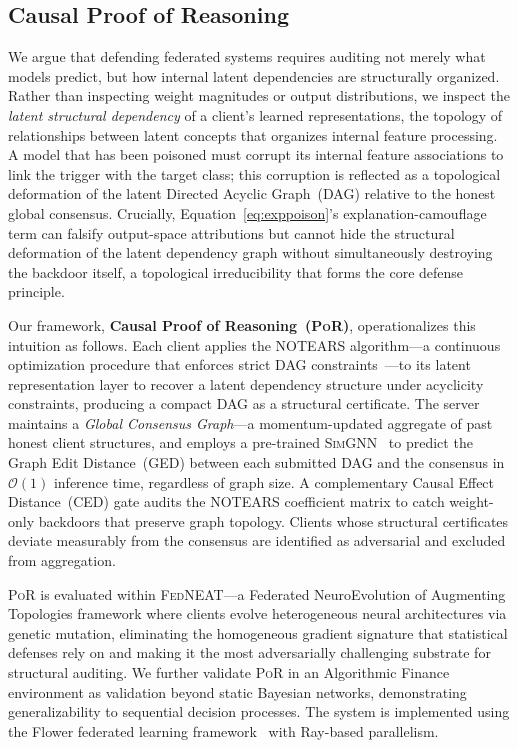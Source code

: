 \documentclass[journal]{IEEEtran}
\newcommand{\por}{\textsc{PoR}}
\newcommand{\fedneat}{\textsc{FedNEAT}}
\newcommand{\simgnn}{\textsc{SimGNN}}
\newcommand{\notears}{\textsc{NOTEARS}}
\begin{document}
\subsection{Causal Proof of Reasoning}

We argue that defending federated systems requires auditing not merely
what models predict, but how internal latent dependencies are structurally
organized. Rather than inspecting weight magnitudes or output distributions,
we inspect the \textit{latent structural dependency} of a client's learned
representations, the topology of relationships between latent concepts
that organizes internal feature processing. A model that has been poisoned
must corrupt its internal feature associations to link the trigger with the
target class; this corruption is reflected as a topological deformation of
the latent Directed Acyclic Graph~(DAG) relative to the honest global
consensus. Crucially, Equation~\eqref{eq:exppoison}'s explanation-camouflage
term can falsify output-space attributions but cannot hide the structural
deformation of the latent dependency graph without simultaneously destroying
the backdoor itself, a topological irreducibility that forms the core
defense principle.

Our framework, \textbf{Causal Proof of Reasoning~(\por{})}, operationalizes
this intuition as follows. Each client applies the \notears{} algorithm---a
continuous optimization procedure that enforces strict DAG
constraints~\cite{zheng2018notears}---to its latent representation layer
to recover a latent dependency structure under acyclicity constraints,
producing a compact DAG as a structural certificate.
The server maintains a \textit{Global Consensus Graph}---a momentum-updated
aggregate of past honest client structures, and employs a pre-trained
\simgnn{}~\cite{bai2019simgnn} to predict the Graph Edit Distance~(GED)
between each submitted DAG and the consensus in $\mathcal{O}(1)$ inference
time, regardless of graph size. A complementary Causal Effect
Distance~(CED) gate audits the NOTEARS coefficient matrix to catch
weight-only backdoors that preserve graph topology. Clients whose structural
certificates deviate measurably from the consensus are identified as
adversarial and excluded from aggregation.

\por{} is evaluated within \fedneat{}---a Federated NeuroEvolution of
Augmenting Topologies framework where clients evolve heterogeneous neural
architectures via genetic mutation, eliminating the homogeneous gradient
signature that statistical defenses rely on and making it the most
adversarially challenging substrate for structural auditing. We further
validate \por{} in an Algorithmic Finance environment as validation beyond
static Bayesian networks, demonstrating generalizability to sequential
decision processes. The system is implemented using the Flower federated
learning framework~\cite{beutel2020flower} with Ray-based parallelism.
\end{document}
